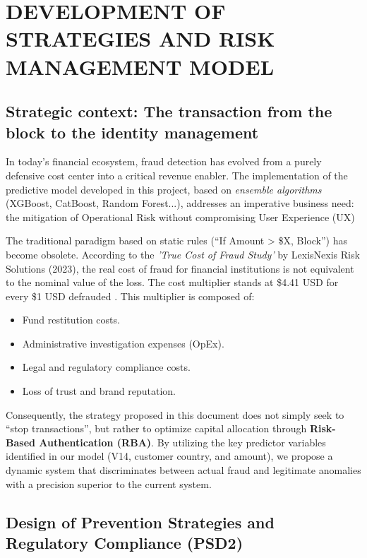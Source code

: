 \documentclass[12pt,a4paper]{report}
\begin{document}
\chapter{DEVELOPMENT OF STRATEGIES AND RISK MANAGEMENT MODEL}

\section{Strategic context: The transaction from the block to the identity management}

In today's financial ecosystem, fraud detection has evolved from a purely defensive cost center into a critical revenue enabler. The implementation of the predictive model developed in this project, based on \textit{ensemble algorithms} (XGBoost, CatBoost, Random Forest...), addresses an imperative business need: the mitigation of Operational Risk without compromising User Experience (UX)

The traditional paradigm based on static rules (\textquotedblleft If Amount > \$X, Block\textquotedblright) has become obsolete. According to the \textit{'True Cost of Fraud Study'} by LexisNexis Risk Solutions (2023), the real cost of fraud for financial institutions is not equivalent to the nominal value of the loss. The cost multiplier stands at \$4.41 USD for every \$1 USD defrauded \cite{Lexisnexis2023a}. This multiplier is composed of:



\begin{itemize}
    \item Fund restitution costs.
    \item Administrative investigation expenses (OpEx).
    \item Legal and regulatory compliance costs.
    \item Loss of trust and brand reputation.
\end{itemize}


Consequently, the strategy proposed in this document does not simply seek to \textquotedblleft stop transactions\textquotedblright, but rather to optimize capital allocation through \textbf{Risk-Based Authentication (RBA)}. By utilizing the key predictor variables identified in our model (V14, customer country, and amount), we propose a dynamic system that discriminates between actual fraud and legitimate anomalies with a precision superior to the current system.


\section{Design of Prevention Strategies and Regulatory Compliance (PSD2)}
\end{document}
